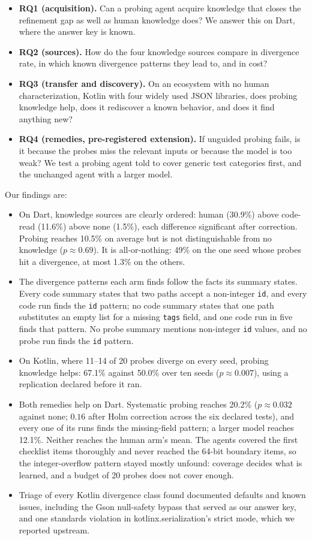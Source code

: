 \begin{itemize}
\item \textbf{RQ1 (acquisition).} Can a probing agent acquire knowledge
that closes the refinement gap as well as human knowledge does? We answer
this on Dart, where the answer key is known.
\item \textbf{RQ2 (sources).} How do the four knowledge sources compare in
divergence rate, in which known divergence patterns they lead to, and in
cost?
\item \textbf{RQ3 (transfer and discovery).} On an ecosystem with no human
characterization, Kotlin with four widely used JSON libraries, does probing
knowledge help, does it rediscover a known behavior, and does it find
anything new?
\item \textbf{RQ4 (remedies, pre-registered extension).} If unguided
probing fails, is it because the probes miss the relevant inputs or because
the model is too weak? We test a probing agent told to cover generic test
categories first, and the unchanged agent with a larger model.
\end{itemize}

Our findings are:

\begin{itemize}
\item On Dart, knowledge sources are clearly ordered: human (30.9\%) above
code-read (11.6\%) above none (1.5\%), each difference significant after
correction. Probing reaches 10.5\% on average but is not distinguishable
from no knowledge ($p \approx 0.69$). It is all-or-nothing: 49\% on the one
seed whose probes hit a divergence, at most 1.3\% on the others.
\item The divergence patterns each arm finds follow the facts its summary
states. Every code summary states that two paths accept a non-integer
\texttt{id}, and every code run finds the \texttt{id} pattern; no code
summary states that one path substitutes an empty list for a missing
\texttt{tags} field, and one code run in five finds that pattern. No probe summary mentions non-integer \texttt{id}
values, and no probe run finds the \texttt{id} pattern.
\item On Kotlin, where 11--14 of 20 probes diverge on every seed, probing
knowledge helps: 67.1\% against 50.0\% over ten seeds ($p \approx 0.007$),
using a replication declared before it ran.
\item Both remedies help on Dart. Systematic probing reaches 20.2\%
($p \approx 0.032$ against none; $0.16$ after Holm correction across the
six declared tests), and every one of its runs finds the missing-field
pattern; a larger model reaches 12.1\%. Neither reaches the human arm's mean.
The agents covered the first checklist items thoroughly and never reached
the 64-bit boundary items, so the integer-overflow pattern stayed mostly
unfound: coverage decides what is learned, and a budget of 20 probes does not
cover enough.
\item Triage of every Kotlin divergence class found documented defaults and
known issues, including the Gson null-safety bypass that served as our
answer key, and one standards violation in kotlinx.serialization's strict
mode, which we reported upstream.
\end{itemize}

